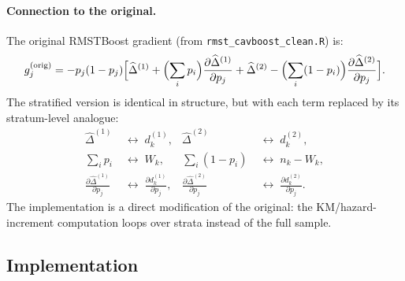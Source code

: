 \documentclass[11pt,letterpaper]{article}
\begin{document}
\paragraph{Connection to the original.}
The original RMSTBoost gradient (from \texttt{rmst\_cavboost\_clean.R}) is:
\[
g_j^{\text{(orig)}} = -p_j(1-p_j)\Big[
\widehat\Delta^{(1)} + \Bigl(\sum_i p_i\Bigr)\frac{\partial
  \widehat\Delta^{(1)}}{\partial p_j}
+ \widehat\Delta^{(2)} - \Bigl(\sum_i (1-p_i)\Bigr)\frac{\partial
  \widehat\Delta^{(2)}}{\partial p_j}
\Big].
\]
The stratified version is identical in structure, but with each term
replaced by its stratum-level analogue:
\begin{align*}
\widehat\Delta^{(1)} &\;\leftrightarrow\; d_k^{(1)},
& \widehat\Delta^{(2)} &\;\leftrightarrow\; d_k^{(2)},\\
\sum_i p_i &\;\leftrightarrow\; W_k,
& \sum_i (1-p_i) &\;\leftrightarrow\; n_k-W_k,\\
\frac{\partial\widehat\Delta^{(1)}}{\partial p_j}
&\;\leftrightarrow\; \frac{\partial d_k^{(1)}}{\partial p_j},
&
\frac{\partial\widehat\Delta^{(2)}}{\partial p_j}
&\;\leftrightarrow\; \frac{\partial d_k^{(2)}}{\partial p_j}.
\end{align*}
The implementation is a direct modification of the original: the
KM/hazard-increment computation loops over strata instead of the full
sample.

\subsection{Implementation}
\end{document}

